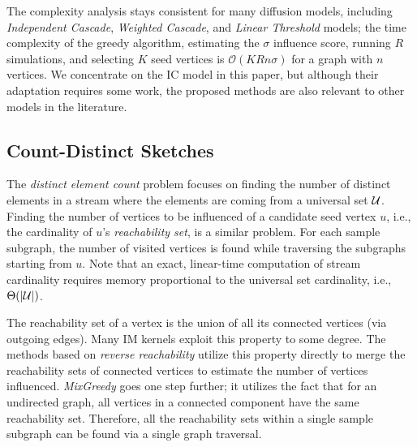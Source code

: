 \documentclass[review]{elsarticle}
\newcommand\kktodo[1]{\textcolor{red}{#1}}
\begin{document}
The complexity analysis stays consistent for many diffusion models, including {\em Independent Cascade}, {\em Weighted Cascade}, and {\em Linear Threshold} models; the time complexity of the greedy algorithm, estimating the $\sigma$ influence score, running $R$ simulations, and selecting $K$ seed vertices is $\mathcal{O}(KRn\sigma)$ for a graph with $n$ vertices. 
We concentrate on the IC model in this paper, but although their adaptation requires some work, the proposed methods are also relevant to other models in the literature.

\subsection{Count-Distinct Sketches}\label{sec:sketch}
The {\em distinct element count} problem focuses on finding the number of distinct elements in a stream where the elements are coming from a universal set ${\cal U}$. Finding the number of vertices to be influenced of a candidate seed vertex $u$, i.e., the cardinality of $u$'s {\em reachability set}, is a similar problem. For each sample subgraph, the number of visited vertices is found while traversing the subgraphs starting from $u$. Note that an exact, linear-time computation of stream cardinality requires memory proportional to the universal set cardinality, i.e., ${\Theta}(|{\cal U}|)$. 

The reachability set of a vertex is the union of all its connected vertices (via outgoing edges). Many IM kernels exploit this property to some degree. The methods based on {\em reverse reachability} \cite{borgs2014maximizing} %
utilize this property directly to merge the reachability sets of connected vertices to estimate the number of vertices influenced. {\em MixGreedy} \cite{MixGreedy} %
goes one step further; it utilizes the fact that for an undirected graph, all vertices in a connected component have the same reachability set. Therefore, all the reachability sets within a single sample subgraph can be found via a single graph traversal. 
\end{document}
